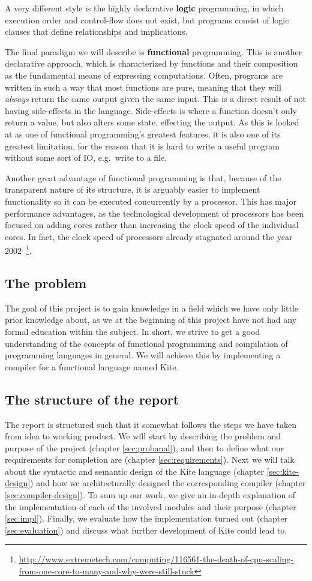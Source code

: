 A very different style is the highly declarative \textbf{logic} programming, in which execution order and control-flow does not exist, but programs consist of logic clauses that define relationships and implications.

The final paradigm we will describe is \textbf{functional} programming. This is another declarative approach, which is characterized by functions and their composition as the fundamental means of expressing computations. Often, programs are written in such a way that most functions are pure, meaning that they will \emph{always} return the same output given the same input. This is a direct result of not having side-effects in the language. Side-effects is where a function doesn't only return a value, but also alters some state, effecting the output. As this is looked at as one of functional programming's greatest features, it is also one of its greatest limitation, for the reason that it is hard to write a useful program without some sort of IO, e.g.\ write to a file.

Another great advantage of functional programming is that, because of the transparent nature of its structure, it is arguably easier to implement functionality so it can be executed concurrently by a processor. This has major performance advantages, as the technological development of processors has been focused on adding cores rather than increasing the clock speed of the individual cores. In fact, the clock speed of processors already stagnated around the year 2002~\footnote{\url{http://www.extremetech.com/computing/116561-the-death-of-cpu-scaling-from-one-core-to-many-and-why-were-still-stuck}}.


\subsection{The problem}
The goal of this project is to gain knowledge in a field which we have only little prior knowledge about, as we at the beginning of this project have not had any formal education within the subject. In short, we strive to get a good understanding of the concepts of functional programming and compilation of programming languages in general. We will achieve this by implementing a compiler for a functional language named Kite.


\subsection{The structure of the report}
The report is structured such that it somewhat follows the steps we have taken from idea to working product. We will start by describing the problem and purpose of the project (chapter \ref{sec:probanal}), and then to define what our requirements for completion are (chapter \ref{sec:requirements}). Next we will talk about the syntactic and semantic design of the Kite language (chapter \ref{sec:kite-design}) and how we architecturally designed the corresponding compiler (chapter \ref{sec:compiler-design}). To sum up our work, we give an in-depth explanation of the implementation of each of the involved modules and their purpose (chapter \ref{sec:impl}). Finally, we evaluate how the implementation turned out (chapter \ref{sec:evaluation}) and discuss what further development of Kite could lead to.
